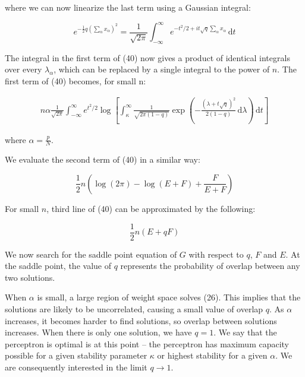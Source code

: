 \noindent where we can now linearize the last term using a Gaussian integral:

\begin{equation}
    e^{-\frac{1}{2} q \left( \sum_\alpha x_\alpha \right) ^2} = \frac{1}{\sqrt{2 \pi}} \int_{- \infty}^{\infty} e^{- t^2 / 2 + it \sqrt{q} \sum_\alpha x_\alpha } \, \mathrm{d} t
\end{equation}

The integral in the first term of (40) now gives a product of identical integrals over every $\lambda_\alpha$, which can be replaced by a single integral to the power of $n$. The first term of (40) becomes, for small n:

\begin{gather}
    n \alpha \frac{1}{\sqrt{2\pi}} \int_{- \infty}^{\infty} e^{t^2 / 2} \log \left[ \int_\kappa^\infty \frac{1}{\sqrt{2 \pi (1 - q)}} \exp \left( - \frac{(\lambda + t \sqrt{q})^2}{2(1 - q)} \, \mathrm{d} \lambda \right) \, \mathrm{d} t \right]
\end{gather}

\noindent where $\alpha = \frac{p}{N}$.

We evaluate the second term of (40) in a similar way:

\begin{equation}
    \frac{1}{2} n \left( \log (2 \pi) - \log (E + F) + \frac{F}{E + F} \right)
\end{equation}

For small $n$, third line of (40) can be approximated by the following:

\begin{equation}
    \frac{1}{2} n (E + qF)
\end{equation}

We now search for the saddle point equation of $G$ with respect to $q$, $F$ and $E$. At the saddle point, the value of $q$ represents the probability of overlap between any two solutions.

When $\alpha$ is small, a large region of weight space solves (26). This implies that the solutions are likely to be uncorrelated, causing a small value of overlap $q$. As $\alpha$ increases, it becomes harder to find solutions, so overlap between solutions increases. When there is only one solution, we have $q = 1$. We say that the perceptron is optimal is at this point -- the perceptron has maximum capacity possible for a given stability parameter $\kappa$ or highest stability for a given $\alpha$. We are consequently interested in the limit $q \longrightarrow 1$.

